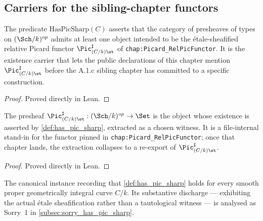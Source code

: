 \subsection{Carriers for the sibling-chapter functors}
\label{subsec:fga_pic_functor_carriers}

\begin{definition}
  \label{def:has_pic_sharp}
  The predicate \(\mathrm{HasPicSharp}(C)\) asserts that the category of presheaves of
  types on \((\Sch/k)^{op}\) admits at least one object intended to be the
  \'etale-sheafified relative Picard functor \(\Pic^\sharp_{(C/k)\et}\) of
  \texttt{chap:Picard\_RelPicFunctor}. It is the existence carrier that lets the
  public declarations of this chapter mention \(\Pic^\sharp_{(C/k)\et}\)
  before the A.1.c sibling chapter has committed to a specific construction.
\end{definition}

\begin{proof}
  Proved directly in Lean.
\end{proof}

\begin{definition}
  \label{def:pic_sharp_carrier}
  The presheaf \(\Pic^\sharp_{(C/k)\et} : (\Sch/k)^{op} \to \Set\) is the object whose
  existence is asserted by \cref{def:has_pic_sharp}, extracted as a chosen
  witness. It is a file-internal stand-in for the functor pinned in
  \texttt{chap:Picard\_RelPicFunctor}; once that chapter lands, the extraction
  collapses to a re-export of \(\Pic^\sharp_{(C/k)\et}\).
\end{definition}

\begin{proof}
  Proved directly in Lean.
\end{proof}

\begin{definition}
  \label{def:inst_has_pic_sharp}
  The canonical instance recording that \cref{def:has_pic_sharp} holds for
  every smooth proper geometrically integral curve \(C/k\). Its substantive
  discharge --- exhibiting the actual \'etale sheafification rather than a
  tautological witness --- is analysed as Sorry~1 in
  \cref{subsec:sorry_has_pic_sharp}.
\end{definition}

